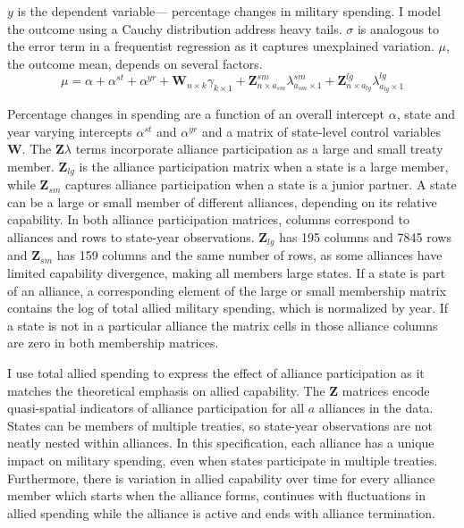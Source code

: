 \documentclass[12pt]{article}
\begin{document}
$y$ is the dependent variable--- percentage changes in military spending. 
I model the outcome using a Cauchy distribution address heavy tails.
$\sigma$ is analogous to the error term in a frequentist regression as it captures unexplained variation.  
$\mu$, the outcome mean, depends on several factors.
\begin{equation}
\mu = \alpha + \alpha^{st} + \alpha^{yr} +\textbf{W}_{n \times k} \gamma_{k \times 1} + \textbf{Z}^{sm}_{n \times a_{sm}} \lambda^{sm}_{a_{sm} \times 1} + \textbf{Z}^{lg}_{n \times a_{lg}} \lambda^{lg}_{a_{lg} \times 1} 
\end{equation}


Percentage changes in spending are a function of an overall intercept $\alpha$, state and year varying intercepts $\alpha^{st}$ and $\alpha^{yr}$ and a matrix of state-level control variables $\textbf{W}$.
The $\textbf{Z} \lambda$ terms incorporate alliance participation as a large and small treaty member. 
$\textbf{Z}_{lg}$ is the alliance participation matrix when a state is a large member, while $\textbf{Z}_{sm}$ captures alliance participation when a state is a junior partner. 
A state can be a large or small member of different alliances, depending on its relative capability. 
In both alliance participation matrices, columns correspond to alliances and rows to state-year observations. 
$\textbf{Z}_{lg}$ has 195 columns and 7845 rows and $\textbf{Z}_{sm}$ has 159 columns and the same number of rows, as some alliances have limited capability divergence, making all members large states. 
If a state is part of an alliance, a corresponding element of the large or small membership matrix contains the log of total allied military spending, which is normalized by year.
If a state is not in a particular alliance the matrix cells in those alliance columns are zero in both membership matrices.


I use total allied spending to express the effect of alliance participation as it matches the theoretical emphasis on allied capability. 
The $\textbf{Z}$ matrices encode quasi-spatial indicators of alliance participation for all $a$ alliances in the data. 
States can be members of multiple treaties, so state-year observations are not neatly nested within alliances. 
In this specification, each alliance has a unique impact on military spending, even when states participate in multiple treaties. 
Furthermore, there is variation in allied capability over time for every alliance member which starts when the alliance forms, continues with fluctuations in allied spending while the alliance is active and ends with alliance termination. 
\end{document}
